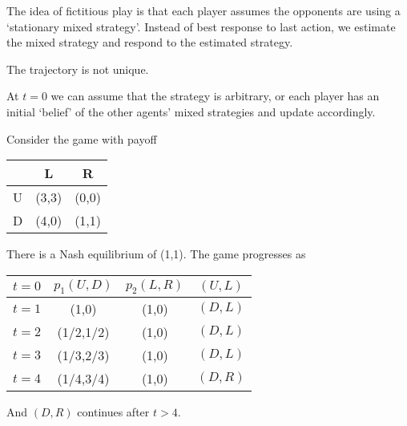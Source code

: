 The idea of fictitious play is that each player assumes the opponents are using a `stationary mixed strategy'.
Instead of best response to last action, we estimate the mixed strategy and respond to the estimated strategy.
\begin{remark}
    The trajectory is not unique.
\end{remark}
\begin{remark}
    At $t=0$ we can assume that the strategy is arbitrary, or each player has an initial `belief' of the other agents' mixed strategies and update accordingly.
\end{remark}
\begin{aexample}{}{}
    Consider the game with payoff
    \begin{center}
       
        \begin{tabular}{|c|c c|} 
            \hline &L & R\\
            
            \hline
            U&(3,3)&(0,0)\\
            \hline D&(4,0)&(1,1)
            \\ \hline
        \end{tabular}
        \end{center}
        There is a Nash equilibrium of (1,1). The game progresses as 
        \begin{center}
       
            \begin{tabular}{|c|c c c|} 
                \hline 
                $t=0$ & $p_1(U,D)$&$p_2(L,R)$& $(U,L)$\\
                \hline $t=1$ & (1,0) & (1,0) & $(D,L)$\\
                \hline
                $t=2$ & (1/2,1/2) & (1,0) & $(D,L)$\\
                \hline 
                $t=3$ & (1/3,2/3) & (1,0) & $(D,L)$
                \\
                \hline 
                $t=4$ & (1/4,3/4)& (1,0)  & $(D,R)$\\ \hline
            \end{tabular}
            \end{center}
            And $(D,R)$ continues after $t>4$.
\end{aexample}

